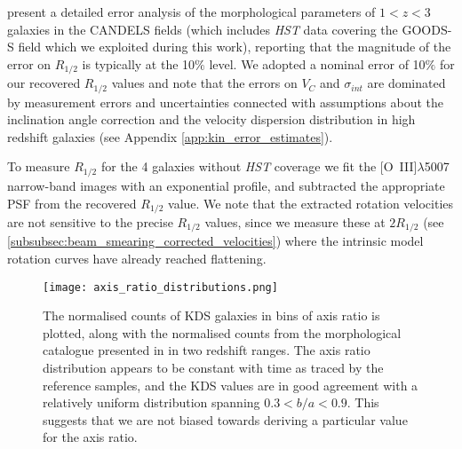 \documentclass[fleqn,usenatbib]{mnras}
\begin{document}
\noindent
\cite{Bruce2012} present a detailed error analysis of the morphological parameters of $1 < z < 3$ galaxies in the CANDELS fields (which includes {\em HST} data covering the GOODS-S field which we exploited during this work), reporting that the magnitude of the error on $R_{1/2}$ is typically at the 10$\%$ level.
We adopted a nominal error of 10$\%$ for our recovered $R_{1/2}$ values and note that the errors on $V_{C}$ and $\sigma_{int}$ are dominated by measurement errors and uncertainties connected with assumptions about the inclination angle correction and the velocity dispersion distribution in high redshift galaxies (see Appendix \ref{app:kin_error_estimates}).

\noindent
To measure $R_{1/2}$ for the 4 galaxies without {\em HST} coverage we fit the [O~{\sc III}]$\lambda$5007 narrow-band images with an exponential profile, and subtracted the appropriate PSF from the recovered $R_{1/2}$ value.
We note that the extracted rotation velocities are not sensitive to the precise $R_{1/2}$ values, since we measure these at $2R_{1/2}$ (see \cref{subsubsec:beam_smearing_corrected_velocities}) where the intrinsic model rotation curves have already reached flattening.

\begin{figure}
\centering \hspace{-1.13cm}
\texttt{[image: axis\_ratio\_distributions.png]}
\caption{The normalised counts of KDS galaxies in bins of axis ratio is plotted, along with the normalised counts from the morphological catalogue presented in \protect\cite{VanderWel2012} in two redshift ranges.
    The axis ratio distribution appears to be constant with time as traced by the reference samples, and the KDS values are in good agreement with a relatively uniform distribution spanning $0.3 < b/a < 0.9$.
    This suggests that we are not biased towards deriving a particular value for the axis ratio.}
\label{fig:morpho-distributions}
\end{figure}
\end{document}
